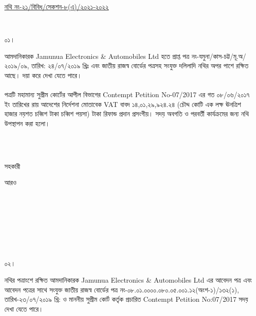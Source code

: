 \documentclass[12pt]{article}
\newcommand{\fileno}{নথি নং-২১/বিবিধ/সেকশন-৮(এ)/২০২১-২০২২}
\newcommand{\nbrl}{নং-০৮.০১.০০০০.০৮০.০৫.০০১.১২(অংশ-১)/১৩২(১), তারিখ-২৩/০৭/২০১৯ খ্রি:}
\newcommand{\tvat}{১৪,০১,২৯,৯২৪.২৪ (চৌদ্দ কোটি এক লক্ষ ঊনত্রিশ হাজার নয়শত চব্বিশ টাকা চব্বিশ পয়সা) টাকা}
\begin{document}
\begin{minipage}[t]{0.59\linewidth}
\hspace{0.5em}
\end{minipage}
\begin{minipage}[t]{1\textwidth}
\underline{{\fileno}}
\end{minipage}
\\
\begin{minipage}[t]{0.05\linewidth}
০১।
\end{minipage}
\begin{minipage}[t]{1\linewidth}
আমদানিকারক
Jamunua Electronics \& Automobiles Ltd
হতে প্রাপ্ত
পত্র নং-যমুনা/কাস-চট্ট/মূ.অ/২০১৯/০৯,
তারিখ: ২৪/০৭/২০১৯ খ্রিঃ
এবং জাতীয় রাজস্ব বোর্ডের পত্রসহ সংযুক্ত
দলিলাদি নথির অপর পাশে রক্ষিত আছে।
দয়া করে দেখা যেতে পারে।
\\
\\
পত্রটি মহামান্য সুপ্রীম কোর্টের আপীল বিভাগের
Contempt Petition No-07/2017
এর গত ০৮/০৬/২০১৭ ইং তারিখের
রায় আদেশের নির্দেশনা মোতাবেক
VAT বাবদ
{\tvat} রিফান্ড প্রদান প্রসংগীয়।
সদয় অবগতি ও পরবর্তী কার্যক্রমের জন্য
নথি উপস্থাপন করা হলো।
\end{minipage}
\\
\\
\begin{minipage}[t]{0.05\linewidth}
\hspace{1em}
\end{minipage}
\begin{minipage}[t]{.5\linewidth}
সহকারী
\end{minipage}
\begin{minipage}[t]{1\linewidth}
আরও
\end{minipage}
\\
\\
\\
\\
\\
\\
\begin{minipage}[t]{0.05\linewidth}
০২।
\end{minipage}
\begin{minipage}[t]{1\linewidth}
নথির পত্রাংশে রক্ষিত আমদানিকারক
Jamunua Electronics \& Automobiles Ltd
এর আবেদন পত্র এবং আবেদন পত্রের সাথে সংযুক্ত
জাতীয় রাজস্ব বোর্ডের পত্র
{\nbrl} ও মাননীয় সুপ্রীম কোর্ট কর্তৃক প্রচারিত
Contempt Petition No:07/2017
সদয় দেখা যেতে পারে।
\end{minipage}
\\
\\
\\
\end{document}
